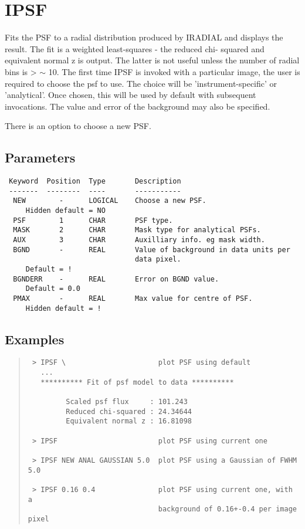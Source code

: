 \documentclass{book}
\renewcommand{\_}{{\tt\char'137}}     %
\begin{document}
\section{IPSF}
Fits the PSF to a radial distribution produced by IRADIAL and displays
the result. The fit is a weighted least-squares - the reduced chi-
squared and equivalent normal z is output. The latter is not useful
unless the number of radial bins is > $\sim$ 10. The first time IPSF is
invoked with a particular image, the user is required to choose the
psf to use. The choice will be 'instrument-specific' or 'analytical'.
Once chosen, this will be used by default with subsequent invocations.
The value and error of the background may also be specified.
 
There is an option to choose a new PSF.
 
\subsection{Parameters}
\begin{verbatim}
 Keyword  Position  Type       Description
 -------  --------  ----       -----------
  NEW        -      LOGICAL    Choose a new PSF.
     Hidden default = NO
  PSF        1      CHAR       PSF type.
  MASK       2      CHAR       Mask type for analytical PSFs.
  AUX        3      CHAR       Auxilliary info. eg mask width.
  BGND       -      REAL       Value of background in data units per
                               data pixel.
     Default = !
  BGNDERR    -      REAL       Error on BGND value.
     Default = 0.0
  PMAX       -      REAL       Max value for centre of PSF.
     Hidden default = !
\end{verbatim}\subsection{Examples}
\begin{quote}\begin{verbatim}
 > IPSF \                      plot PSF using default
   ...
   ********** Fit of psf model to data **********
 
         Scaled psf flux     : 101.243
         Reduced chi-squared : 24.34644
         Equivalent normal z : 16.81098
 
 > IPSF                        plot PSF using current one
 
 > IPSF NEW ANAL GAUSSIAN 5.0  plot PSF using a Gaussian of FWHM 5.0
 
 > IPSF 0.16 0.4               plot PSF using current one, with a
                               background of 0.16+-0.4 per image pixel
\end{verbatim}\end{quote}
\end{document}
